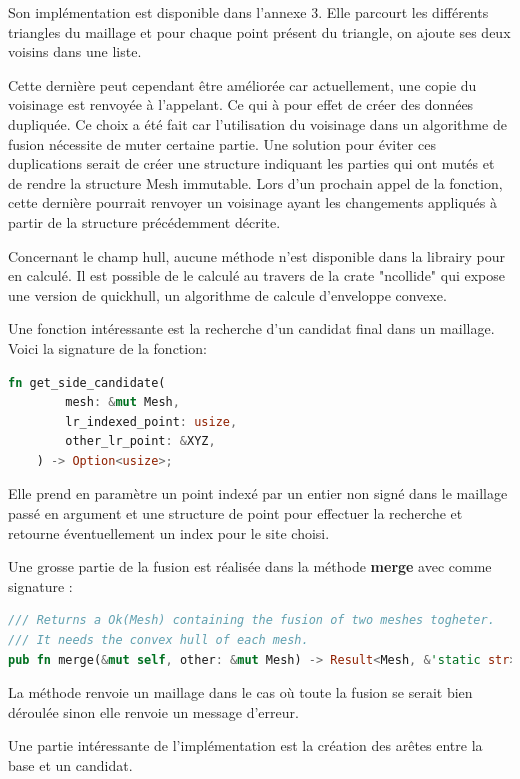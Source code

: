 Son implémentation est disponible dans l'annexe 3. 
Elle parcourt les différents triangles du maillage et pour chaque point présent du triangle, on ajoute ses deux voisins dans une liste.

Cette dernière peut cependant
être améliorée car actuellement, une copie du voisinage est renvoyée à
l'appelant. Ce qui à pour effet de créer des données dupliquée. Ce choix a été
fait car l'utilisation du voisinage dans un algorithme de fusion nécessite de
muter certaine partie. Une solution pour éviter ces duplications serait de créer
une structure indiquant les parties qui ont mutés et de rendre la structure Mesh
immutable. Lors d'un prochain appel de la fonction, cette dernière pourrait
renvoyer un voisinage ayant les changements appliqués à partir de la structure
précédemment décrite.  

Concernant le champ hull, aucune méthode n'est disponible dans la librairy pour en calculé. Il est possible de le calculé au travers de la crate "ncollide" qui expose une version de quickhull, un algorithme de calcule d'enveloppe convexe.

Une fonction intéressante est la recherche d'un candidat final dans un maillage. Voici la signature de la fonction:
\begin{lstlisting}[language=Rust, style=boxed]
fn get_side_candidate(
        mesh: &mut Mesh,
        lr_indexed_point: usize,
        other_lr_point: &XYZ,
    ) -> Option<usize>;
\end{lstlisting}

Elle prend en paramètre un point indexé par un entier non signé dans le maillage passé en argument et une structure de point pour effectuer la recherche et retourne éventuellement un index pour le site choisi.

Une grosse partie de la fusion est réalisée dans la méthode \textbf{merge} avec comme signature : 
\begin{lstlisting}[language=Rust, style=boxed]
/// Returns a Ok(Mesh) containing the fusion of two meshes togheter.
/// It needs the convex hull of each mesh.
pub fn merge(&mut self, other: &mut Mesh) -> Result<Mesh, &'static str>;
\end{lstlisting}

La méthode renvoie un maillage dans le cas où toute la fusion se serait bien déroulée sinon elle renvoie un message d'erreur.

Une partie intéressante de l'implémentation est la création des arêtes entre la base et un candidat.


